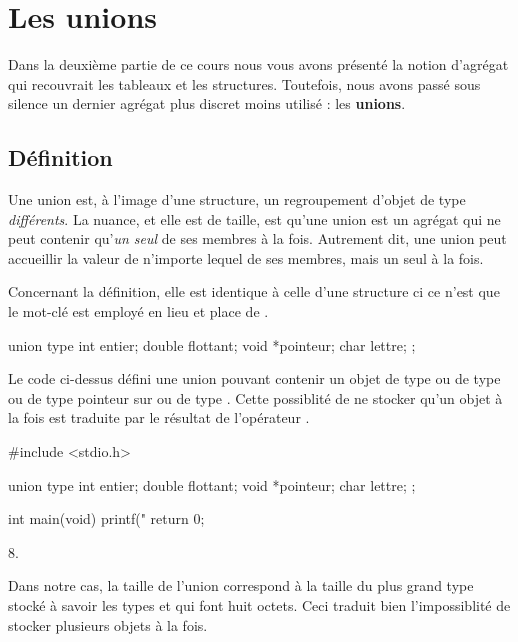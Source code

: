\chapter{Les unions }
\label{chap:Les unions}

Dans la deuxième partie de ce cours nous vous avons présenté
  la notion d'agrégat qui recouvrait les tableaux et les structures.
  Toutefois, nous avons passé sous silence un dernier agrégat plus
  discret moins utilisé : les \textbf{unions}.

\section{Définition }
\label{sec:definition-5}

Une union est, à l'image d'une structure, un regroupement d'objet de 
type \emph{différents}. La nuance, et elle est de taille, est qu'une 
union est un agrégat qui ne peut contenir qu'\emph{un seul} de ses 
membres à la fois. Autrement dit, une union peut accueillir la valeur 
de n'importe lequel de ses membres, mais un seul à la fois.

Concernant la définition, elle est identique à celle d'une structure ci
ce n'est que le mot-clé  est employé en lieu et place de
.

\begin{C}
union type
{
    int entier;
    double flottant;
    void *pointeur;
    char lettre;
};
\end{C}

Le code ci-dessus défini une union  pouvant contenir un
objet de type  ou de type  ou de type
pointeur sur  ou de type . Cette possiblité de
ne stocker qu'un objet à la fois est traduite par le résultat de
l'opérateur .

\begin{C}
#include <stdio.h>

union type
{
    int entier;
    double flottant;
    void *pointeur;
    char lettre;
};


int main(void)
{
    printf("%
    return 0; 
}
\end{C}

\begin{C}
8.
\end{C}

Dans notre cas, la taille de l'union correspond à la taille du plus
grand type stocké à savoir les types  et 
qui font huit octets. Ceci traduit bien l'impossiblité de stocker
plusieurs objets à la fois.


